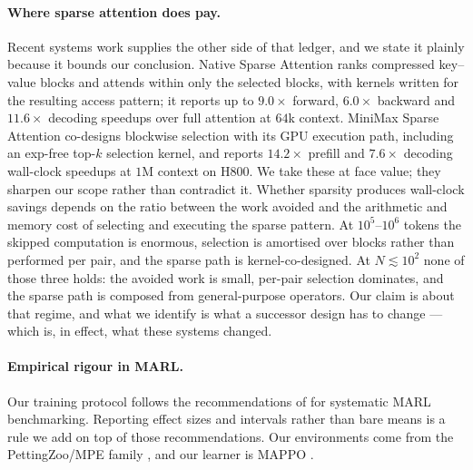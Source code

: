 \paragraph{Where sparse attention does pay.} Recent systems work supplies the
other side of that ledger, and we state it plainly because it bounds our
conclusion. Native Sparse Attention \citep{yuan2025nsa} ranks compressed
key--value blocks and attends within only the selected blocks, with kernels
written for the resulting access pattern; it reports up to $9.0\times$ forward,
$6.0\times$ backward and $11.6\times$ decoding speedups over full attention at
$64$k context. MiniMax Sparse Attention \citep{lai2026msa} co-designs blockwise
selection with its GPU execution path, including an exp-free top-$k$ selection
kernel, and reports $14.2\times$ prefill and $7.6\times$ decoding wall-clock
speedups at $1$M context on H800. We take these at face value; they sharpen our
scope rather than contradict it. Whether sparsity produces wall-clock savings
depends on the ratio between the work avoided and the arithmetic and memory
cost of selecting and executing the sparse pattern. At $10^5$--$10^6$ tokens the
skipped computation is enormous, selection is amortised over blocks rather than
performed per pair, and the sparse path is kernel-co-designed. At
$N \lesssim 10^2$ none of those three holds: the avoided work is small,
per-pair selection dominates, and the sparse path is composed from
general-purpose operators. Our claim is about that regime, and what we identify
is what a successor design has to change --- which is, in effect, what these
systems changed.

\paragraph{Empirical rigour in MARL.} Our training protocol follows the
recommendations of \citet{papoudakis2021epymarl} for systematic MARL
benchmarking. Reporting effect sizes and intervals rather than bare means is a
rule we add on top of those recommendations. Our environments come
from the PettingZoo/MPE family \citep{terry2020pettingzoo}, and our learner is
MAPPO \citep{yu2022mappo}.

